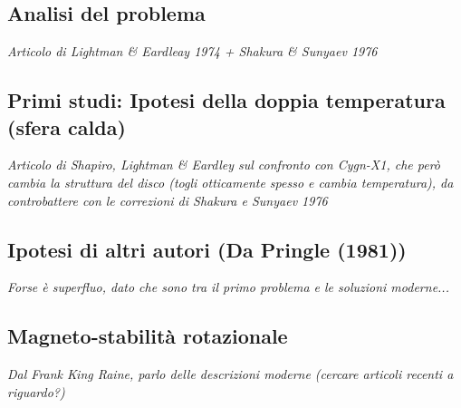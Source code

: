 \documentclass[a4paper]{article}
\begin{document}
	\subsection{Analisi del problema}

		\emph{Articolo di Lightman \& Eardleay 1974 + Shakura \& Sunyaev 1976}

	\subsection{Primi studi: Ipotesi della doppia temperatura (sfera calda)}

		\emph{Articolo di Shapiro, Lightman \& Eardley sul confronto con Cygn-X1, che però cambia la struttura del disco (togli otticamente spesso e cambia temperatura), da controbattere con le correzioni di Shakura e Sunyaev 1976}\\
	
	\subsection{Ipotesi di altri autori (Da Pringle (1981))}
	
		\emph{Forse è superfluo, dato che sono tra il primo problema e le soluzioni moderne...}
		
	\subsection{Magneto-stabilità rotazionale}
		\emph{Dal Frank King Raine, parlo delle descrizioni moderne (cercare articoli recenti a riguardo?)}
\end{document}
